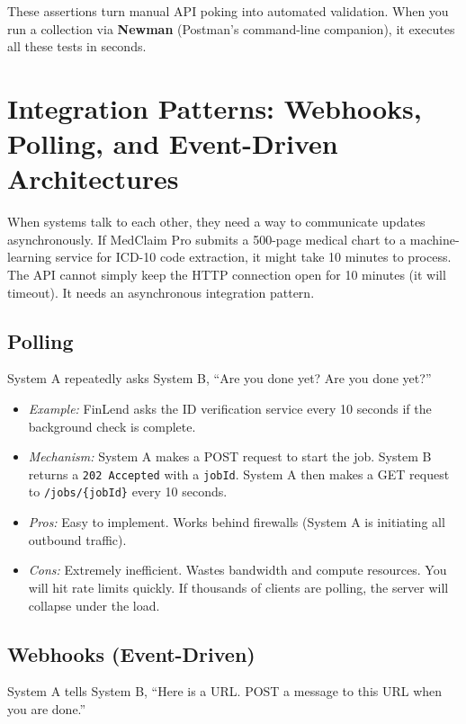 \documentclass[
  11pt,
  openany,
  oneside]{book}
\providecommand{\tightlist}{%
  \setlength{\itemsep}{0pt}\setlength{\parskip}{0pt}}
\begin{document}
These assertions turn manual API poking into automated validation. When
you run a collection via \textbf{Newman} (Postman's command-line
companion), it executes all these tests in seconds.

\section{Integration Patterns: Webhooks, Polling, and Event-Driven
Architectures}\label{integration-patterns-webhooks-polling-and-event-driven-architectures}

When systems talk to each other, they need a way to communicate updates
asynchronously. If MedClaim Pro submits a 500-page medical chart to a
machine-learning service for ICD-10 code extraction, it might take 10
minutes to process. The API cannot simply keep the HTTP connection open
for 10 minutes (it will timeout). It needs an asynchronous integration
pattern.

\subsection{Polling}\label{polling}

System A repeatedly asks System B, ``Are you done yet? Are you done
yet?''

\begin{itemize}
\tightlist
\item
  \emph{Example:} FinLend asks the ID verification service every 10
  seconds if the background check is complete.
\item
  \emph{Mechanism:} System A makes a POST request to start the job.
  System B returns a \texttt{202\ Accepted} with a \texttt{jobId}.
  System A then makes a GET request to \texttt{/jobs/\{jobId\}} every 10
  seconds.
\item
  \emph{Pros:} Easy to implement. Works behind firewalls (System A is
  initiating all outbound traffic).
\item
  \emph{Cons:} Extremely inefficient. Wastes bandwidth and compute
  resources. You will hit rate limits quickly. If thousands of clients
  are polling, the server will collapse under the load.
\end{itemize}

\subsection{Webhooks (Event-Driven)}\label{webhooks-event-driven}

System A tells System B, ``Here is a URL. POST a message to this URL
when you are done.''
\end{document}
